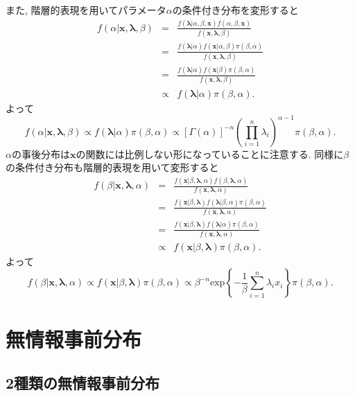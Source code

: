 \documentclass[titlepage,twoside]{jarticle}
\theoremstyle{definition}
\begin{document}
また, 階層的表現を用いてパラメータ$\alpha$の条件付き分布を変形すると
\begin{eqnarray*}
f(\alpha |\bm{x},\bm{\lambda },\beta )
&=&
\frac{f(\bm{\lambda }|\alpha ,\beta ,\bm{x})f(\alpha ,\beta ,\bm{x})}
{f(\bm{x},\bm{\lambda },\beta )} \\
&=&
\frac{f(\bm{\lambda }|\alpha )f(\bm{x}|\alpha ,\beta )\pi(\beta ,\alpha )}
{f(\bm{x},\bm{\lambda },\beta )} \\
&=&
\frac{f(\bm{\lambda }|\alpha )f(\bm{x}|\beta )\pi(\beta ,\alpha )}
{f(\bm{x},\bm{\lambda },\beta )} \\
&\propto &
f(\bm{\lambda }|\alpha )\pi(\beta ,\alpha).
\end{eqnarray*}
よって
\begin{equation}\label{pdf:alpha}
f(\alpha |\bm{x},\bm{\lambda },\beta ) 
\propto
f(\bm{\lambda }|\alpha )\pi (\beta ,\alpha ) 
\propto
[\Gamma(\alpha )]^{-n}
\left(\prod_{i=1}^{n}\lambda_{i}\right)^{\alpha -1}\pi(\beta ,\alpha).
\end{equation}
$\alpha $の事後分布は$\bm{x}$の関数には比例しない形になっていることに注意する.
同様に$\beta$の条件付き分布も階層的表現を用いて変形すると 
\begin{eqnarray*}
f(\beta |\bm{x},\bm{\lambda },\alpha )
&=&
\frac{f(\bm{x}|\beta ,\bm{\lambda },\alpha )f(\beta ,\bm{\lambda },\alpha )}
{f(\bm{x},\bm{\lambda },\alpha )} \\
&=&
\frac{f(\bm{x}|\beta ,\bm{\lambda })f(\bm{\lambda }|\beta ,\alpha )\pi(\beta ,\alpha )}
{f(\bm{x},\bm{\lambda },\alpha )}\\
&=&
\frac{f(\bm{x}|\beta ,\bm{\lambda })f(\bm{\lambda }|\alpha )\pi(\beta ,\alpha )}
{f(\bm{x},\bm{\lambda },\alpha )} \\
&\propto &
f(\bm{x}|\beta ,\bm{\lambda })\pi(\beta ,\alpha).
\end{eqnarray*}
よって
\begin{equation}\label{pdf:beta}
f(\beta |\bm{x},\bm{\lambda },\alpha )
\propto
f(\bm{x}|\beta ,\bm{\lambda })\pi(\beta ,\alpha )
\propto
\beta ^{-n}\mbox{exp}\left\{-\frac{1}{\beta }\sum_{i=1}^{n}\lambda _{i}x_{i}\right\}
\pi(\beta ,\alpha ).
\end{equation}

\section{無情報事前分布}\label{prior}

\subsection{2種類の無情報事前分布}
\end{document}
